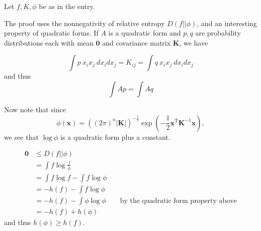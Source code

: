 \documentclass[12pt]{article}
\newcommand{\mv}[1]{\mathbf{#1}}	%
\newcommand{\mvt}[1]{\mv{#1}^{\mathrm{T}}}
\begin{document}
Let $f, K, \phi$ be as in the  entry.

The proof uses the nonnegativity of relative entropy $D(f||\phi)$, and an interesting  property of quadratic forms.  If $A$ is a quadratic form and $p,q$ are probability distributions each with mean $\mv{0}$ and covariance matrix $\mv{K}$, we have

\begin{equation}
\int p\ x_i x_j\ dx_i dx_j = K_{ij} = \int q\ x_i x_j\ dx_i dx_j
\end{equation}
and thus
\begin{equation}
\int A p = \int A q
\end{equation}

Now note that since
\begin{equation}
\phi(\mv{x}) = \left((2\pi)^n |\mv{K}| \right)^{-\frac{1}{2}} \exp{(- \frac{1}{2} \mvt{x} \mv{K}^{-1} \mv{x})},
\end{equation}
we see that $\log \phi$ is a quadratic form plus a constant.

\begin{eqnarray*}
\textbf{0} &\le D(f||\phi)\\
&= \int f \log \frac{f}{\phi}\\
&= \int f \log f - \int f \log \phi\\
&= -h(f) - \int f \log \phi\\
&= -h(f) - \int \phi \log \phi \qquad \text{by the quadratic form property above}\\
&= -h(f) + h(\phi)
\end{eqnarray*}
and thus $h(\phi) \ge h(f)$.
\end{document}
